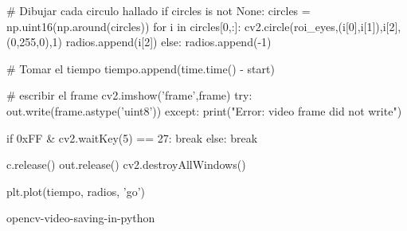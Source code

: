 \documentclass[es,gi]{ifirak}\usepackage[]{graphicx}\usepackage[]{color}
\begin{document}
\begin{python}
                # Dibujar cada circulo hallado
                if circles is not None:
                    circles = np.uint16(np.around(circles))
                    for i in circles[0,:]:
                        cv2.circle(roi_eyes,(i[0],i[1]),i[2],(0,255,0),1)
                    radios.append(i[2])
                else:
                    radios.append(-1)
                
                # Tomar el tiempo 
                tiempo.append(time.time() - start)        
        
        # escribir el frame
        cv2.imshow('frame',frame)
        try:
            out.write(frame.astype('uint8'))
        except:
            print("Error: video frame did not write")
        
        if 0xFF & cv2.waitKey(5) == 27:
            break
    else:
        break
        
c.release()
out.release()
cv2.destroyAllWindows()

plt.plot(tiempo, radios, 'go')
\end{python}

\begin{thebibliography}{arauak}
	
\bibitem[StackOverflow] opencv-video-saving-in-python
\end{thebibliography}
\end{document}
